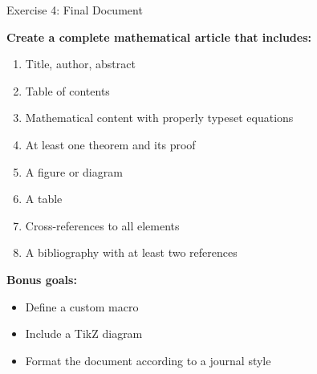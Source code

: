 	\begin{frame}{Exercise 4: Final Document}
		\begin{practice}
			\textbf{Create a complete mathematical article that includes:}
			\begin{enumerate}
				\item Title, author, abstract
				\item Table of contents
				\item Mathematical content with properly typeset equations
				\item At least one theorem and its proof
				\item A figure or diagram
				\item A table
				\item Cross-references to all elements
				\item A bibliography with at least two references
			\end{enumerate}
		\end{practice}
		
		\textbf{Bonus goals:}
		\begin{itemize}
			\item Define a custom macro
			\item Include a TikZ diagram
			\item Format the document according to a journal style
		\end{itemize}
	\end{frame}
	
